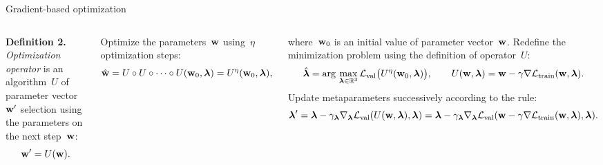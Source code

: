 \documentclass[12pt, aspectratio=169]{beamer}
\begin{document}
\begin{frame}{Gradient-based optimization}

\begin{columns}[c]
\fontsize{11}{5}\selectfont
\textbf{Definition 2.} \emph{Optimization operator} is an algorithm~$U$ of parameter vector~$\mathbf{w}^\prime$ selection using the parameters on the next step~$\mathbf{w}$:
\vspace{-0.2 cm}
\fontsize{10}{5}\selectfont
\begin{equation*}
    \mathbf{w}^\prime = U(\mathbf{w}).
\end{equation*}

\fontsize{11}{5}\selectfont
Optimize the parameters~$\mathbf{w}$ using~$\eta$ optimization steps:
\vspace{-0.2 cm}
\fontsize{10}{5}\selectfont
\begin{equation*}
    \hat{\mathbf{w}} = U \circ U \circ \dots \circ U(\mathbf{w}_0, \boldsymbol{\lambda}) = U^\eta(\mathbf{w}_0, \boldsymbol{\lambda}),
\end{equation*}

\noindent
\fontsize{11}{5}\selectfont
where~$\mathbf{w}_0$ is an initial value of parameter vector~$\mathbf{w}$.
\fontsize{11}{5}\selectfont
Redefine the minimization problem using the definition of operator~$U$:
\vspace{-0.2 cm}
$$\hat{\boldsymbol{\lambda}} = \arg\,\max\limits_{\boldsymbol{\lambda} \in \mathbb{R}^3} \mathcal{L}_\text{val}\bigl(U^\eta(\mathbf{w}_0, \boldsymbol{\lambda})\bigr), \qquad U(\mathbf{w}, \boldsymbol{\lambda}) = \mathbf{w} - \gamma\nabla\mathcal{L}_\text{train}(\mathbf{w}, \boldsymbol{\lambda}).$$
\fontsize{11}{5}\selectfont
Update metaparameters successively according to the rule:
\vspace{-0.2 cm}
\fontsize{10}{5}\selectfont
\begin{equation}
\boldsymbol{\lambda}^\prime = \boldsymbol{\lambda} - \gamma_{\boldsymbol{\lambda}}\nabla_{\boldsymbol{\lambda}}\mathcal{L}_\text{val}(U(\mathbf{w}, \boldsymbol{\lambda}), \boldsymbol{\lambda}) = \boldsymbol{\lambda} - \gamma_{\boldsymbol{\lambda}}\nabla_{\boldsymbol{\lambda}}\mathcal{L}_\text{val}(\mathbf{w} - \gamma\nabla\mathcal{L}_\text{train}(\mathbf{w}, \boldsymbol{\lambda}), \boldsymbol{\lambda}).
\label{eq:hyp_alg}
\end{equation}


\end{columns}
\end{frame}
\end{document}
